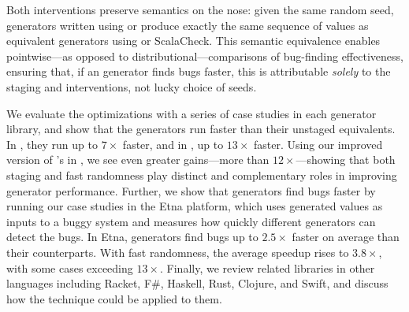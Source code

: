 \documentclass[acmsmall]{acmart}
\theoremstyle{definition}
\begin{document}
Both interventions preserve semantics on the nose: given the same
random seed, generators written using \camlname or \scalaname produce
exactly the same sequence of values as equivalent generators using \bq
or ScalaCheck.  This semantic equivalence enables pointwise---as
opposed to distributional---comparisons of bug-finding effectiveness,
ensuring that, if an \name{} generator finds bugs faster, this is
attributable \textit{solely} to the staging and \rand interventions,
not lucky choice of seeds.

We evaluate the optimizations with a series of case studies in each
generator library, and show that the \name{} generators run faster
than their unstaged equivalents. In \camlname, they run up to $7\times$
faster, and in \scalaname, up to $13\times$ faster. Using our improved version
of \bq's \rand in \camlname, we see even greater gains---more than $12\times$---showing that
both staging and fast randomness play distinct and complementary roles in improving generator performance.
Further,
we show that \camlname generators find bugs faster by running our case studies
in the Etna platform, which uses generated values as
inputs to a buggy system and measures how quickly different
generators can detect the bugs. In Etna,
\camlname generators find bugs up to $2.5\times$ faster on average than
their \bq counterparts. With fast randomness,
the average speedup rises to $3.8\times$,
with some cases exceeding $13\times$. Finally, we review related libraries
in other languages including Racket, F\#, Haskell, Rust, Clojure, and Swift,
and discuss how the \name{} technique could be applied to them.
\end{document}
